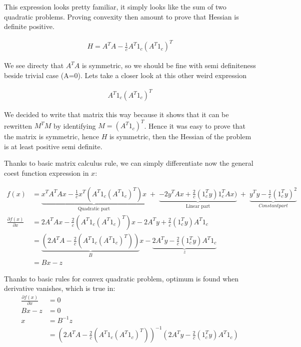 \documentclass{article}
\begin{document}
    This expression looks pretty familiar, it simply looks like the sum of two quadratic problems.
    Proving convexity then amount to prove that Hessian is definite positive.

    \begin{align*}
	H = A^{T}A - \frac{1}{c} A^{T}1_{c}(A^{T}1_{c})^{T}
    \end{align*}

    We see directy that $A^{T}A$ is symmetric, so we should be fine with semi definiteness beside trivial case (A=0). Lets take a closer look at this other weird expression

    \begin{align*}
	A^{T}1_{c}(A^{T}1_{c})^{T}
    \end{align*}

    We decided to write that matrix this way because it shows that it can be rewritten $M^{T}M$ by identifying $M=(A^{T}1_{c})^{T}$. Hence it was easy to prove that the matrix is symmetric, hence $H$ is symmetric, then the Hessian of the problem is at least positive semi definite.

    Thanks to basic matrix calculus rule, we can simply differentiate now the general coest function expression in $x$:

    \begin{align*}
	      f(x) &= \underbrace{x^{T}A^{T}Ax -\frac{1}{c} x^{T}(A^{T}1_{c}(A^{T}1_{c})^{T})x}_{\text{Quadratic part}} \; + \; \underbrace{-2y^{T}Ax +\frac{2}{c}(1_{c}^{T}y)1_{c}^{T}Ax )}_{\text{Linear part}} \; + \; \underbrace{y^{T}y -\frac{1}{c}(1_{c}^{T}y)^2}_{Constant part} \\
	      \frac{\partial f(x)}{\partial x} &= 2 A^{T}Ax - \frac{2}{c}(A^{T}1_{c}(A^{T}1_{c})^{T})x -2A^{T}y + \frac{2}{c}(1_{c}^{T}y)A^{T}1_{c} \\
	      &= \underbrace{\left( 2 A^{T}A - \frac{2}{c}(A^{T}1_{c}(A^{T}1_{c})^{T}) \right)}_{B} x - \underbrace{2A^{T}y - \frac{2}{c}(1_{c}^{T}y)A^{T}1_{c}}_{z} \\
	      &= Bx-z
    \end{align*}

    Thanks to basic rules for convex quadratic problem, optimum is found when derivative vanishes, which is true in:
    \begin{align*}
	\frac{\partial f(x)}{\partial x} &= 0 \\
	Bx-z &= 0 \\
	x &= B^{-1}z \\
	&= \left( 2 A^{T}A - \frac{2}{c}(A^{T}1_{c}(A^{T}1_{c})^{T}) \right)^{-1} \left( 2A^{T}y - \frac{2}{c} (1_{c}^{T}y) A^{T}1_{c}\right)
    \end{align*}
\end{document}
